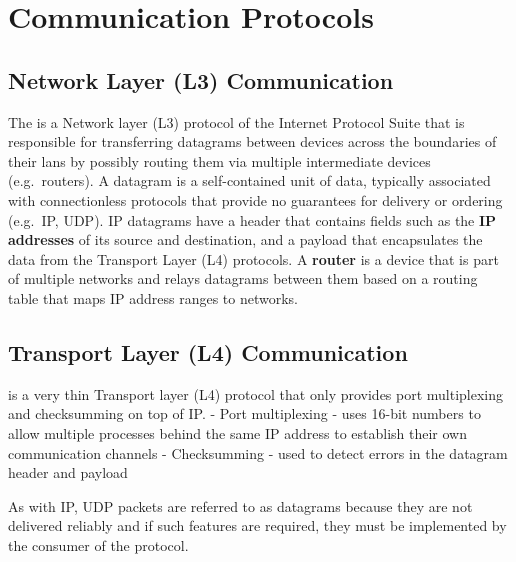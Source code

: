 
\hypertarget{communication-protocols}{%
\section{Communication Protocols}\label{communication-protocols}}

\hypertarget{network-layer-l3-communication}{%
\subsection{Network Layer (L3)
Communication}\label{network-layer-l3-communication}}

The  \autocite{ipv4RFC} is a Network layer (L3) protocol
of the Internet Protocol Suite that is responsible for transferring
datagrams between devices across the boundaries of their \glspl{lan} by
possibly routing them via multiple intermediate devices (e.g.~routers).
A datagram is a self-contained unit of data, typically associated with
connectionless protocols that provide no guarantees for delivery or
ordering (e.g.~IP, UDP).
 IP datagrams
have a header that contains fields such as the \textbf{IP addresses} of
its source and destination, and a
payload that encapsulates the data from the Transport Layer (L4)
protocols. A \textbf{router} is a device that is part of multiple
networks and relays datagrams between them based on a routing table that
maps IP address ranges to networks.

\hypertarget{transport-layer-l4-communication}{%
\subsection{Transport Layer (L4)
Communication}\label{transport-layer-l4-communication}}

 is a very thin Transport layer (L4) protocol that only
provides port multiplexing and checksumming on top of IP. - Port
multiplexing - uses 16-bit numbers to allow multiple processes behind
the same IP address to establish their own communication channels -
Checksumming - used to detect errors in the datagram header and payload

As with IP, UDP packets are referred to as datagrams because they are
not delivered reliably and if such features are required, they must be
implemented by the consumer of the protocol.

